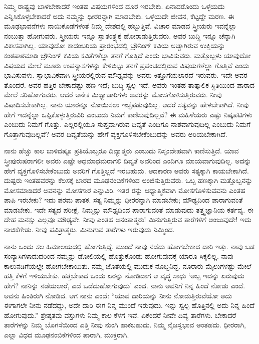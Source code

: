 ನಿಮ್ಮ ರಾಷ್ಟ್ರವು ಬಾಳಬೇಕಾದರೆ ಇಂತಹ ವಿಷಯಗಳಿಂದ ದೂರ ಇರಬೇಕು. ಏನಾದರೊಂದು ಒಳ್ಳೆಯದು ಎನ್ನಿಸಿಕೊಳ್ಳಬೇಕಾದರೆ ಅದು ನಮ್ಮನ್ನು ಧೀರರನ್ನಾಗಿ ಮಾಡಬೇಕು. ಒಳ್ಳೆಯದೇ ಜೀವನ, ಕೆಟ್ಟದ್ದೇ ಮರಣ. ಈ ಮೂಢಭಾವನೆಗಳು ನಾಯಿಕೊಡೆಗಳಂತೆ ನಿಮ್ಮ ದೇಶದಲ್ಲಿ ಹಬ್ಬುತ್ತಿವೆ. ವಿಚಾರ ಮಾಡದ ಸ್ತ್ರೀಯರು ಇವನ್ನೆಲ್ಲಾ ನಂಬುತ್ತಾ ಹೋಗುವರು. ಸ್ತ್ರೀಯರು ಇನ್ನೂ ಸ್ವಾತಂತ್ರ್ಯಕ್ಕೆ ಹೋರಾಡುತ್ತಿರುವರು. ಅವರ ಬುದ್ಧಿ ಇನ್ನೂ ಚೆನ್ನಾಗಿ ವಿಕಾಸವಾಗಿಲ್ಲ. ಯಾವುದೋ ಕಾದಂಬರಿಯ ಪ್ರಾರಂಭದಲ್ಲಿ ಬ್ರೌನಿಂಗ್​ ಕವಿಯ ಅಚ್ಚಾಗಿರುವ ಉಕ್ತಿಯನ್ನು ಕಂಠಪಾಠಮಾಡಿ ಬ್ರೌನಿಂಗ್​ ಕವಿಯ ಕವಿತೆಗಳೆಲ್ಲಾ ತನಗೆ ಗೊತ್ತಿದೆ ಎಂದು ಭಾವಿಸುವರು. ಮತ್ತೊಬ್ಬಳು ಯಾವುದೋ ವಿಷಯದ ಮೇಲೆ ಮೂರು ಉಪನ್ಯಾಸಗಳನ್ನು ಕೇಳಿಬಿಟ್ಟು ತನಗೆ ಪ್ರಪಂಚದಲ್ಲಿರುವ ವಿಷಯಗಳೆಲ್ಲಾ ಗೊತ್ತಿವೆ ಎಂದು ಭಾವಿಸುವಳು. ಸ್ವಾಭಾವಿಕವಾಗಿ ಸ್ತ್ರೀಯರಲ್ಲಿರುವ ಮೌಢ್ಯವನ್ನು ಅವರು ಕಿತ್ತೊಗೆಯಲಾರದೆ ಇರುವರು. ಇದೇ ಅವರ ತೊಂದರೆ. ಅವರ ಹತ್ತಿರ ಬೇಕಾದಷ್ಟು ಹಣ ಇದೆ; ಬುದ್ಧಿ ಸ್ವಲ್ಪ ಇದೆ. ಅವರು ಇಂತಹ ತಾತ್ಕಾಲಿಕ ಸ್ಥಿತಿಯಿಂದ ಪಾರಾದ ಮೇಲೆ ಸರಿಹೋಗುವರು. ಆದರೆ ಅನೇಕ ಮಿಥ್ಯಾಚಾರಿಗಳು ಅವರನ್ನು ಮೋಸಗೊಳಿಸುತ್ತಿರುವರು. ನೀವು ವಿಷಾದಿಸಬೇಕಾಗಿಲ್ಲ. ನಾನು ಯಾರನ್ನೂ ನೋಯಿಸಲು ಇಚ್ಛೆಪಡುವುದಿಲ್ಲ. ಆದರೆ ಸತ್ಯವನ್ನು ಹೇಳಬೇಕಾಗಿದೆ. ನೀವು ಹೇಗೆ ಇದನ್ನೆಲ್ಲಾ ಒಪ್ಪಿಕೊಳ್ಳುತ್ತಿರುವಿರಿ ಎಂಬುದು ನಿಮಗೆ ಕಾಣಿಸುವುದಿಲ್ಲವೆ? ಈ ಮಹಿಳೆಯರು ಎಷ್ಟು ನಿಷ್ಕಪಟಿಗಳು ಎಂಬುದು ನಿಮಗೆ ಗೊತ್ತು. ಎಲ್ಲರಲ್ಲಿಯೂ ಸುಪ್ತವಾಗಿರುವ ದಿವ್ಯತೆ ಎಂದಿಗೂ ನಾಶವಾಗುವುದಿಲ್ಲ ಎಂಬುದು ನಿಮಗೆ ಗೊತ್ತಾಗುವುದಿಲ್ಲವೆ? ಅವರ ದಿವ್ಯತೆಯನ್ನು ಹೇಗೆ ವ್ಯಕ್ತಗೊಳಿಸಬೇಕೆಂಬುದನ್ನು ಅವರು ಅರಿಯಬೇಕಾಗಿದೆ.

ನಾನು ಹೆಚ್ಚು ಕಾಲ ಬಾಳಿದಷ್ಟೂ ಪ್ರತಿಯೊಬ್ಬರೂ ದಿವ್ಯಾತ್ಮರು ಎಂಬುದು ನಿಸ್ಸಂದೇಹವಾಗಿ ಕಾಣಿಸುತ್ತಿದೆ. ಯಾವ ಸ್ತ್ರೀಪುರುಷರಾಗಲೀ ಅವರು ಎಷ್ಟೇ ಅಧಮಾಧಮರಾಗಲಿ ದಿವ್ಯತೆ ಅವರಿಂದ ಎಂದಿಗೂ ಮಾಯವಾಗುವುದಿಲ್ಲ. ಅದನ್ನು ಹೇಗೆ ವ್ಯಕ್ತಗೊಳಿಸಬೇಕೆಂಬುದು ಅವರಿಗೆ ಗೊತ್ತಿಲ್ಲದೆ ಇರಬಹುದು. ಆದಕಾರಣ ಅವರು ಸತ್ಯಕ್ಕಾಗಿ ಕಾಯಬೇಕಾಗಿದೆ. ದುಷ್ಟರು ಇಂತಹವರನ್ನು ಕೆಲಸಕ್ಕೆ ಬಾರದ ಮೂಢನಂಬಿಕೆಗಳಿಂದ ಅಂಜಿಸುತ್ತಿರುವರು. ಒಬ್ಬ ಹಣಕ್ಕಾಗಿ ಮತ್ತೊಬ್ಬನನ್ನು ಮೋಸಮಾಡಿದರೆ ಅವನನ್ನು ಮೋಸಗಾರ ಎನ್ನುವಿರಿ. ಇತರ ರನ್ನು ಆಧ್ಯಾತ್ಮಿಕವಾಗಿ ಮೋಸಗೊಳಿಸುವವನು ಎಂತಹ ಪಾಪಿ ಇರಬೇಕು? ಇದು ಪರಮ ಪಾತಕ. ಸತ್ಯ ನಿಮ್ಮನ್ನು ಧೀರರನ್ನಾಗಿ ಮಾಡಬೇಕು; ಮೌಢ್ಯದಿಂದ ಪಾರಾಗುವಂತೆ ಮಾಡಬೇಕು. ಇದೇ ಸತ್ಯದ ಪರೀಕ್ಷೆ. ನಿಮ್ಮನ್ನು ಮೌಢ್ಯದಿಂದ ಪಾರಾಗುವಂತೆ ಮಾಡುವುದು ತತ್ತ್ವಜ್ಞಾನಿಯ ಕರ್ತವ್ಯ. ಈ ದೇಹ ಮನಸ್ಸು ಎಲ್ಲವೂ ಮೌಢ್ಯವೇ. ನೀವು ಎಂತಹ ಅನಂತಾತ್ಮರು! ಮಿನುಗುತ್ತಿರುವ ತಾರೆಗಳಿಗೆ ಅಂಜುವುದೇ! ಇದು ನಾಚಿಕೆಗೇಡು. ನೀವು ಪವಿತ್ರಾತ್ಮರು. ಮಿನುಗುವ ತಾರೆಗಳು ಇರುವುದು ನಿಮ್ಮಿಂದ.

ನಾನು ಒಂದು ಸಲ ಹಿಮಾಲಯದಲ್ಲಿ ಹೋಗುತ್ತಿದ್ದೆ. ಮುಂದೆ ನಾವು ನಡೆದು ಹೋಗಬೇಕಾದ ದಾರಿ ಇತ್ತು. ನಾವು ಬಡ ಸಂನ್ಯಾಸಿಗಳಾದುದರಿಂದ ನಮ್ಮನ್ನು ಡೋಲಿಯಲ್ಲಿ ಹೊತ್ತುಕೊಂಡು ಹೋಗುವುದಕ್ಕೆ ಯಾರೂ ಸಿಕ್ಕಲಿಲ್ಲ. ನಾವು ಕಾಲುನಡಿಗೆಯಲ್ಲೇ ಹೋಗಬೇಕಾಯಿತು. ನಮ್ಮ ಜೊತೆಯಲ್ಲಿ ಮುದುಕ ನೊಬ್ಬನಿದ್ದ. ನೂರಾರು ಮೈಲುಗಳಷ್ಟು ಮೇಲೆ ಹತ್ತಿ ಕೆಳಗೆ ಇಳಿಯಬೇಕು. ಹತ್ತಬೇಕಾದ ಒಂದು ಏರನ್ನು ನೋಡಿದಾಗ ಆ ವೃದ್ಧ ಸಾಧು ‘ಅಬ್ಬ ಇದನ್ನು ಏರುವುದು ಹೇಗೆ? ನಾನಿನ್ನು ನಡೆಯಲಾರೆ, ಎದೆ ಒಡೆದುಹೋಗುವುದು’ ಎಂದ. ನಾನು ಅವನಿಗೆ ನಿನ್ನ ಹಿಂದೆ ನೋಡು ಎಂದೆ. ಅವನು ಹಿಂತಿರುಗಿ ನೋಡಿದ. ಆಗ ನಾನು ಎಂದೆ: “ಯಾವ ದಾರಿಯನ್ನು ನೀನು ನೋಡುತ್ತಿರುವೆಯೋ ಅದು ಈಗಾಗಲೇ ನೀನು ನಡೆದದ್ದು, ಅದೇ ದಾರಿ ಈಗ ನಿನ್ನ ಮುಂದೆ ಇರುವುದು. ಇನ್ನು ಸ್ವಲ್ಪ ಹೊತ್ತಿನಲ್ಲಿ ಅದು ನಿನ್ನ ಹಿಂದೆ ಹೋಗುವುದು.” ಶ್ರೇಷ್ಠತಮ ವಸ್ತುಗಳು ನಿಮ್ಮ ಕಾಲ ಕೆಳಗೆ ಇವೆ. ಏಕೆಂದರೆ ನೀವೇ ದಿವ್ಯ ತಾರೆಗಳು. ಬೇಕಾದರೆ ತಾರೆಗಳನ್ನು ನಿಮ್ಮ ಬೊಗಸೆಯಿಂದ ಎತ್ತಿ ನೀವು ನುಂಗಿ ಹಾಕಬಹುದು. ನಿಮ್ಮ ನೈಜಸ್ವಭಾವ ಅಂತಹದು. ಧೀರರಾಗಿ, ಎಲ್ಲಾ ವಿಧದ ಮೂಢನಂಬಿಕೆಗಳಿಂದ ಪಾರಾಗಿ, ಮುಕ್ತರಾಗಿ.

